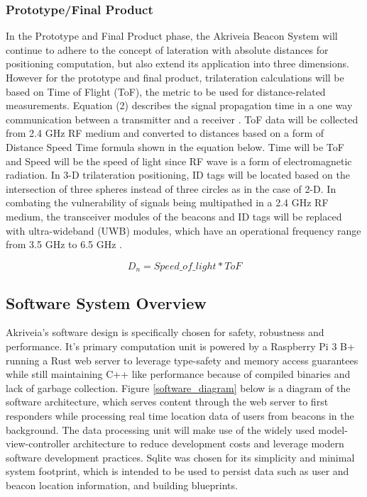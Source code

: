 \subsubsection{Prototype/Final Product}
In the Prototype and Final Product phase, the Akriveia Beacon System will continue to adhere to the concept of lateration with absolute distances for positioning computation, but also extend its application into three dimensions. However for the prototype and final product,  trilateration calculations will be based on Time of Flight (ToF), the metric to be used for distance-related measurements. Equation (2) describes the signal propagation time in a one way communication between a transmitter and a receiver \cite{R6}. ToF data will be collected from 2.4 GHz RF medium and converted to distances based on a form of Distance Speed Time formula shown in the equation below. Time will be ToF and Speed will be the speed of light since RF wave is a form of electromagnetic radiation. In 3-D trilateration positioning, ID tags will be located based on the intersection of three spheres instead of three circles as in the case of 2-D. In combating the vulnerability of signals being multipathed in a 2.4 GHz RF medium, the transceiver modules of the beacons and ID tags will be replaced with ultra-wideband (UWB) modules, which have an operational frequency range from 3.5 GHz to 6.5 GHz \cite{R4}.

\begin{equation}
    D_n = Speed\_of\_light * ToF
\end{equation}

\break

\subsection{Software System Overview}
Akriveia's software design is specifically chosen for safety, robustness and performance. It's primary computation unit is powered by a Raspberry Pi 3 B+ running a Rust web server to leverage type-safety and memory access guarantees while still maintaining C++ like performance because of compiled binaries and lack of garbage collection. Figure \ref{software_diagram} below is a diagram of the software architecture, which serves content through the web server to first responders while processing real time location data of users from beacons in the background. The data processing unit will make use of the widely used model-view-controller architecture to reduce development costs and leverage modern software development practices. Sqlite was chosen for its simplicity and minimal system footprint, which is intended to be used to persist data such as user and beacon location information, and building blueprints.

